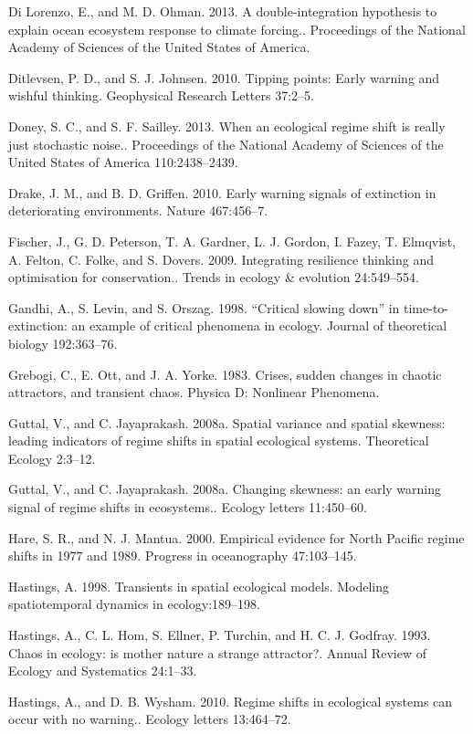 \documentclass{article}
\begin{document}
Di Lorenzo, E., and M. D. Ohman. 2013. A double-integration hypothesis
to explain ocean ecosystem response to climate forcing.. Proceedings of
the National Academy of Sciences of the United States of America.

Ditlevsen, P. D., and S. J. Johnsen. 2010. Tipping points: Early warning
and wishful thinking. Geophysical Research Letters 37:2--5.

Doney, S. C., and S. F. Sailley. 2013. When an ecological regime shift
is really just stochastic noise.. Proceedings of the National Academy of
Sciences of the United States of America 110:2438--2439.

Drake, J. M., and B. D. Griffen. 2010. Early warning signals of
extinction in deteriorating environments. Nature 467:456--7.

Fischer, J., G. D. Peterson, T. A. Gardner, L. J. Gordon, I. Fazey, T.
Elmqvist, A. Felton, C. Folke, and S. Dovers. 2009. Integrating
resilience thinking and optimisation for conservation.. Trends in
ecology \& evolution 24:549--554.

Gandhi, A., S. Levin, and S. Orszag. 1998. ``Critical slowing down'' in
time-to-extinction: an example of critical phenomena in ecology. Journal
of theoretical biology 192:363--76.

Grebogi, C., E. Ott, and J. A. Yorke. 1983. Crises, sudden changes in
chaotic attractors, and transient chaos. Physica D: Nonlinear Phenomena.

Guttal, V., and C. Jayaprakash. 2008a. Spatial variance and spatial
skewness: leading indicators of regime shifts in spatial ecological
systems. Theoretical Ecology 2:3--12.

Guttal, V., and C. Jayaprakash. 2008a. Changing skewness: an early
warning signal of regime shifts in ecosystems.. Ecology letters
11:450--60.

Hare, S. R., and N. J. Mantua. 2000. Empirical evidence for North
Pacific regime shifts in 1977 and 1989. Progress in oceanography
47:103--145.

Hastings, A. 1998. Transients in spatial ecological models. Modeling
spatiotemporal dynamics in ecology:189--198.

Hastings, A., C. L. Hom, S. Ellner, P. Turchin, and H. C. J. Godfray.
1993. Chaos in ecology: is mother nature a strange attractor?. Annual
Review of Ecology and Systematics 24:1--33.

Hastings, A., and D. B. Wysham. 2010. Regime shifts in ecological
systems can occur with no warning.. Ecology letters 13:464--72.
\end{document}
